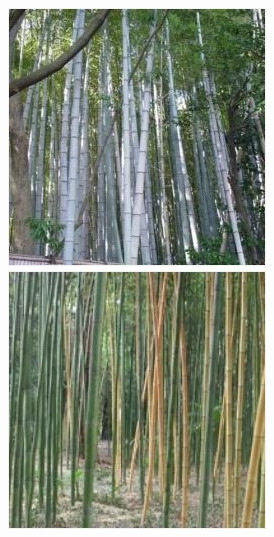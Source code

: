 \documentclass[12pt]{article}
\begin{document}
\begin{figure}[!htbp]
\centering
  \begin{minipage}[t]{0.2 \textwidth}
    \centering \includegraphics[width= \linewidth]{./figures/bamboo} 
    \centering \includegraphics[width= \linewidth]{./figures/bamboo2} 

\end{minipage}
\end{figure}
\end{document}
